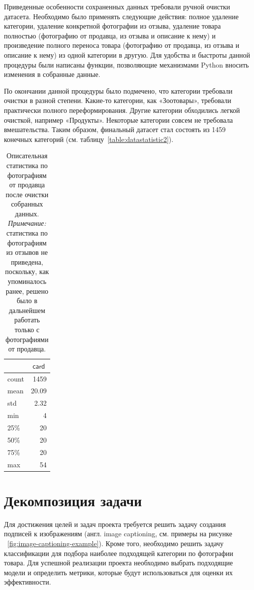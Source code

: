 \documentclass[a4paper,12pt]{extarticle}
\begin{document}
Приведенные особенности сохраненных данных требовали ручной очистки датасета. Необходимо было применять следующие действия: полное удаление категории, удаление конкретной фотографии из отзыва, удаление товара полностью (фотографию от продавца, из отзыва и описание к нему) и произведение полного переноса товара (фотографию от продавца, из отзыва и описание к нему) из одной категории в другую. Для удобства и быстроты данной процедуры были написаны функции, позволяющие механизмами Python вносить изменения в собранные данные.

По окончании данной процедуры было подмечено, что категории требовали очистки в разной степени. Какие-то категории, как «Зоотовары», требовали практически полного переформирования. Другие категории обходились легкой очисткой, например «Продукты». Некоторые категории совсем не требовала вмешательства. Таким образом, финальный датасет стал состоять из 1459 конечных категорий (см. таблицу~\ref{table:datastatistic2}).

\begin{table}[ht]
	\caption{Описательная статистика по фотографиям от продавца после очистки собранных данных. \textsl{Примечание:} статистика по фотографиям из отзывов не приведена, поскольку, как упоминалось ранее, решено было в дальнейшем работать только с фотографиями от продавца.}
	\label{table:datastatistic3}
	\footnotesize
	\centering
	\begin{tabular}{l|r}
		\toprule
		{} & \multicolumn{1}{c}{$\mathsf{card}$}\\
		\midrule
		count &	1459\\
		mean  & 20.09\\
		std   & 2.32\\
		min   &	4\\
		25\%  &	20\\
		50\%  &	20\\
		75\%  &	20\\
		max   &	54 \\
		\bottomrule
	\end{tabular}
\end{table}

\newpage
\section{Декомпозиция задачи} 

Для достижения целей и задач проекта требуется решить задачу создания подписей к изображениям (англ. image captioning, см. примеры на рисунке ~\ref{fig:image-captioning-example}). Кроме того, необходимо решить задачу классификации для подбора наиболее подходящей категории по фотографии товара. Для успешной реализации проекта необходимо выбрать подходящие модели и определить метрики, которые будут использоваться для оценки их эффективности.
\end{document}
